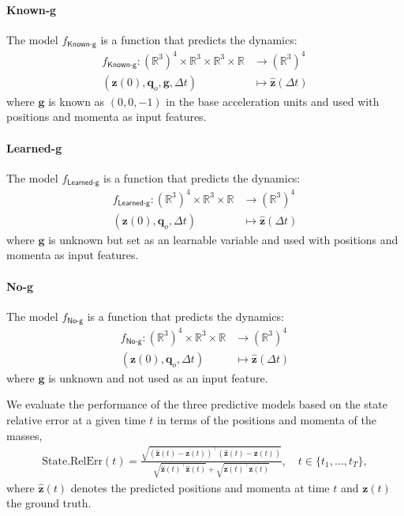 \documentclass[]{article} %
\begin{document}
\paragraph{Known-g} The model $f_{\textsf{Known-g}}$ is a function that predicts the dynamics: 
\begin{equation}
\begin{aligned}
    f_{\textsf{Known-g}}: (\mathbb R^3)^4\times \mathbb{R}^3 \times \mathbb{R}^3 \times \mathbb R &\to (\mathbb R^{3})^4  \\
    (\mathbf{z}(0),\mathbf{q}_o,\mathbf{g},\Delta t) &\mapsto  \mathbf{\hat z}(\Delta t) 
\end{aligned}\label{eq:goal_F_know-g}
\end{equation}
where $\mathbf{g}$ is known as $(0,0,-1)$ in the base acceleration units and used with positions and momenta as input features.  

\paragraph{Learned-g} The model $f_{\textsf{Learned-g}}$ is a function that predicts the dynamics: 
\begin{equation}
\begin{aligned}
    f_{\textsf{Learned-g}}: (\mathbb R^3)^4 \times \mathbb{R}^3 \times \mathbb R &\to (\mathbb R^{3})^4  \\
    (\mathbf{z}(0),\mathbf{q}_o, \Delta t) &\mapsto  \mathbf{\hat z}(\Delta t) 
\end{aligned}\label{eq:goal_F_learn-g}
\end{equation}
where $\mathbf{g}$ is unknown but set as an learnable variable and used with positions and momenta as input features.   

\paragraph{No-g} The model $f_{\textsf{No-g}}$ is a function that predicts the dynamics: 
\begin{equation}
\begin{aligned}
    f_{\textsf{No-g}}: (\mathbb R^3)^4 \times \mathbb{R}^3 \times \mathbb R &\to (\mathbb R^{3})^4  \\
    (\mathbf{z}(0),\mathbf{q}_o, \Delta t) &\mapsto  \mathbf{\hat z}(\Delta t)
\end{aligned}\label{eq:goal_F_no-g}
\end{equation}
where $\mathbf{g}$ is unknown and not used as an input feature.

We evaluate the performance of the three predictive models based on the state relative error at a given time $t$ in terms of the positions and momenta of the masses,
\begin{align}
    \text{State.RelErr}(t) =  \frac{\sqrt{(\hat{\mathbf{z}}(t)-\mathbf{z}(t))^\top (\hat{\mathbf{z}}(t)-\mathbf{z}(t))}}{\sqrt{\hat{\mathbf z}(t)^\top\hat{\mathbf z}(t)}+\sqrt{\mathbf z(t)^\top \mathbf z(t)}}, \quad t\in\{t_1,\ldots,t_T\},\label{eq:state_relerr}
\end{align}
where $\hat{\mathbf{z}}(t)$ denotes the predicted positions and momenta at time $t$ and $\mathbf{z}(t)$ the ground truth.
\end{document}
